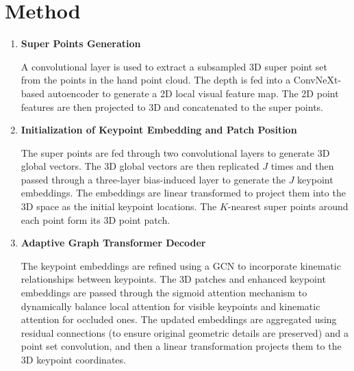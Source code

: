 \documentclass{article}
\begin{document}
\section*{Method}

\begin{enumerate}
    \item \textbf{Super Points Generation}
    
    A convolutional layer is used to extract a subsampled 3D super point set from the points in the hand point cloud. The depth is fed into a ConvNeXt-based autoencoder to generate a 2D local visual feature map. The 2D point features are then projected to 3D and concatenated to the super points.

    \item \textbf{Initialization of Keypoint Embedding and Patch Position}
    
    The super points are fed through two convolutional layers to generate 3D global vectors. The 3D global vectors are then replicated $J$ times and then passed through a three-layer bias-induced layer to generate the $J$ keypoint embeddings. The embeddings are linear transformed to project them into the 3D space as the initial keypoint locations. The $K$-nearest super points around each point form its 3D point patch.

    \item \textbf{Adaptive Graph Transformer Decoder}

     The keypoint embeddings are refined using a GCN to incorporate kinematic relationships between keypoints. The 3D patches and enhanced keypoint embeddings are passed through the sigmoid attention mechanism to dynamically balance local attention for visible keypoints and kinematic attention for occluded ones. The updated embeddings are aggregated using residual connections (to ensure original geometric details are preserved) and a point set convolution, and then a linear transformation projects them to the 3D keypoint coordinates.
\end{enumerate}
\end{document}
